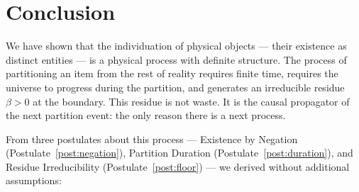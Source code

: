 \documentclass[11pt,twocolumn,a4paper]{article}
\theoremstyle{plain}
\theoremstyle{definition}
\theoremstyle{remark}
\begin{document}
\section{Conclusion}
\label{sec:conclusion}

We have shown that the individuation of physical objects --- their existence as
distinct entities --- is a physical process with definite structure. The process
of partitioning an item from the rest of reality requires finite time, requires
the universe to progress during the partition, and generates an irreducible
residue $\beta > 0$ at the boundary. This residue is not waste. It is the causal
propagator of the next partition event: the only reason there is a next process.

From three postulates about this process --- Existence by Negation
(Postulate~\ref{post:negation}), Partition Duration (Postulate~\ref{post:duration}),
and Residue Irreducibility (Postulate~\ref{post:floor}) --- we derived without
additional assumptions:
\end{document}

